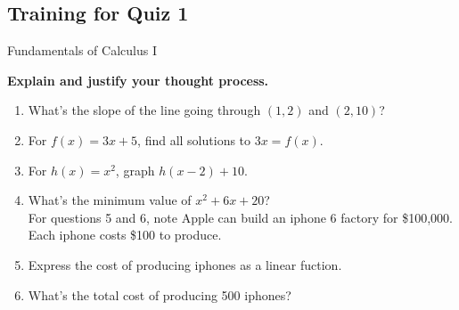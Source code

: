 \documentclass[a4paper, 12pt]{article}
\title{}
\date{}
\newcommand{\bt}[1]{\textbf{#1}} %
\begin{document}
\begin{center}
\section*{Training for Quiz 1}
Fundamentals of Calculus I
\end{center}

\bt{Explain and justify your thought process.}
\begin{enumerate}
    \item What's the slope of the line going through $(1, 2)$ and $(2, 10)$?\\

    \item For $f(x) = 3x + 5$, find all solutions to $3x = f(x)$. \\
    \item For $h(x) = x^2$, graph $h(x-2) + 10$. 

    \item What's the minimum value of $x^2 + 6x + 20$? \\

   For questions 5 and 6, note Apple can build an iphone 6 factory for \$100,000. Each iphone costs \$100 to produce. 
    \item Express the cost of producing iphones as a linear fuction. \\
    \item What's the total cost of producing 500 iphones? \\
\end{enumerate}

\newpage
\end{document}
